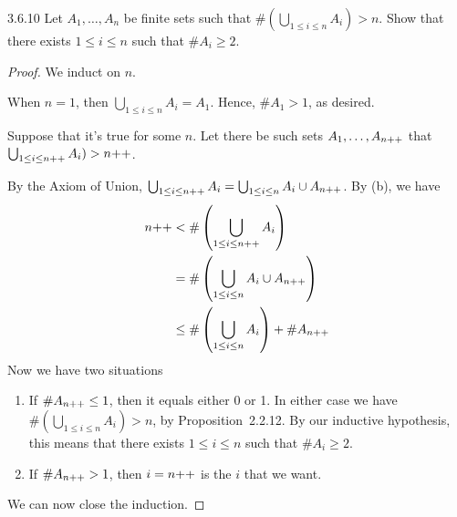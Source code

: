 \begin{exercise}{3.6.10}
	Let $A_1, \dots, A_n$ be finite sets such that $\#(\bigcup_{1 \le i \le n}A_i) > n$. Show that there exists $1 \le i \le n$ such that $\#A_i \ge 2$.
\end{exercise}
\begin{proof}
	We induct on $n$.

	\mybcbox When $n = 1$, then $\bigcup_{1 \le i \le n}A_i = A_1$. Hence, $\#A_1 > 1$, as desired.

	\myisbox Suppose that it's true for some $n$. Let there be such sets $A_1, \dots, A_{n{+}{+}}$ that $\bigcup_{1 \le i \le n{+}{+}}A_i) > n{+}{+}$. 

	By the Axiom of Union, $\bigcup_{1 \le i \le n{+}{+}}A_i = \bigcup_{1 \le i \le n}A_i \cup A_{n{+}{+}}$. By  (b), we have 
	\begin{align*}
		n{+}{+}	&<\#\left(\bigcup_{1 \le i \le n{+}{+}}A_i\right) \\
				&= \#\left(\bigcup_{1 \le i \le n}A_i \cup A_{n{+}{+}}\right) \\
				&\le \#\left(\bigcup_{1 \le i \le n}A_i\right) + \#A_{n{+}{+}}
	\end{align*}
	Now we have two situations
	\begin{enumerate}
		\item If $\#A_{n{+}{+}} \le 1$, then it equals either 0 or 1. In either case we have $\#\left(\bigcup_{1 \le i \le n}A_i\right) > n$, by Proposition~2.2.12.
		By our inductive hypothesis, this means that there exists $1 \le i \le n$ such that $\#A_i \ge 2$.

		\item If $\#A_{n{+}{+}} > 1$, then $i = n{+}{+}$ is the $i$ that we want.
	\end{enumerate}

	We can now close the induction.
\end{proof}

